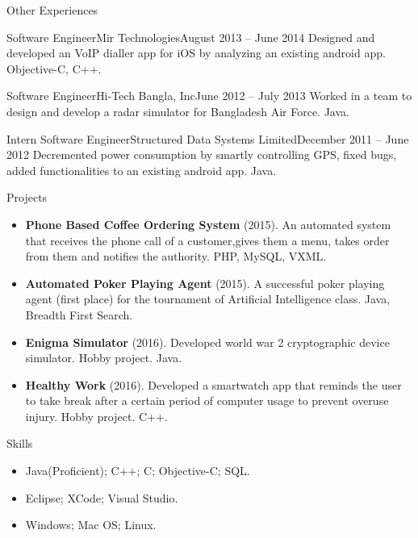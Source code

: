 \documentclass[]{mcdowellcv}
\begin{document}
	\begin{cvsection}{Other Experiences}
		\begin{cvsubsection}{Software Engineer}{Mir Technologies}{August 2013 -- June 2014}
		Designed and developed an VoIP dialler app for iOS by analyzing an existing android app.  Objective-C, C++.
\end{cvsubsection}		
		\begin{cvsubsection}{Software Engineer}{Hi-Tech Bangla, Inc}{June 2012 -- July 2013}	
 Worked in a team to design and develop a radar simulator for Bangladesh Air Force. Java.
			
		\end{cvsubsection}

		\begin{cvsubsection}{Intern Software Engineer}{Structured Data Systems Limited}{December 2011 -- June 2012}	
			Decremented power consumption by smartly controlling GPS, fixed bugs, added functionalities to an existing android app. Java.
		\end{cvsubsection}
	\end{cvsection}
		


	
	
	\begin{cvsection}{Projects}
		\begin{cvsubsection}{}{}{}
			\begin{itemize}
				\item \textbf{Phone Based Coffee Ordering System} (2015). An automated system that receives the phone call of a customer,gives them a menu, takes order from them and notifies the authority.  PHP, MySQL, VXML.
				\item \textbf{Automated Poker Playing Agent} (2015). A successful poker playing agent (first place) for the tournament of Artificial Intelligence class.  Java, Breadth First Search.
				\item \textbf{Enigma Simulator} (2016).  Developed world war 2 cryptographic  device simulator. Hobby project.  Java.
				\item \textbf{Healthy Work} (2016). Developed a smartwatch app that reminds the user to take break after a certain period of computer usage to prevent overuse injury. Hobby project. C++.
			\end{itemize}
		\end{cvsubsection}
	\end{cvsection}
	
	
	\begin{cvsection}{Skills}
		\begin{cvsubsection}{}{}{}	
			\begin{itemize}
				\item Java(Proficient); C++; C; Objective-C; SQL.  
				\item Eclipse; XCode; Visual Studio.
				\item Windows; Mac OS; Linux. 
			\end{itemize}
		\end{cvsubsection}
	\end{cvsection}
	
\end{document}
